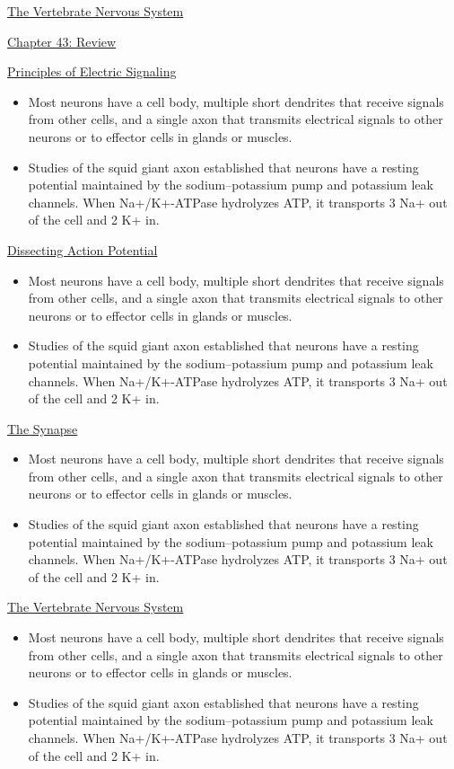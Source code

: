 \documentclass[12pt,letterpaper]{article}
\begin{document}
\begin{secbox}{\hyperlink{43}{The Vertebrate Nervous System}}
{\hypertarget{43.r}{}
\begin{probbox}{\hyperlink{43}{Chapter 43: Review}}\end{probbox}
    \hyperlink{43.1}{Principles of Electric Signaling}
    \begin{itemize} 
        \item Most neurons have a cell body, multiple short dendrites that receive signals from other cells, and a single axon that transmits electrical signals to other neurons or to effector cells in glands or muscles. 
        \item Studies of the squid giant axon established that neurons have a resting potential maintained by the sodium–potassium pump and potassium leak channels. When Na+/K+-ATPase hydrolyzes ATP, it transports 3 Na+ out of the cell and 2 K+ in.
    \end{itemize}
    \hyperlink{43.2}{Dissecting Action Potential}
    \begin{itemize}
        \item Most neurons have a cell body, multiple short dendrites that receive signals from other cells, and a single axon that transmits electrical signals to other neurons or to effector cells in glands or muscles. 
        \item Studies of the squid giant axon established that neurons have a resting potential maintained by the sodium–potassium pump and potassium leak channels. When Na+/K+-ATPase hydrolyzes ATP, it transports 3 Na+ out of the cell and 2 K+ in.     
    \end{itemize}
    \hyperlink{43.3}{The Synapse}
    \begin{itemize}
        \item Most neurons have a cell body, multiple short dendrites that receive signals from other cells, and a single axon that transmits electrical signals to other neurons or to effector cells in glands or muscles. 
        \item Studies of the squid giant axon established that neurons have a resting potential maintained by the sodium–potassium pump and potassium leak channels. When Na+/K+-ATPase hydrolyzes ATP, it transports 3 Na+ out of the cell and 2 K+ in.
    \end{itemize}
    \hyperlink{43.4}{The Vertebrate Nervous System}
    \begin{itemize}
        \item Most neurons have a cell body, multiple short dendrites that receive signals from other cells, and a single axon that transmits electrical signals to other neurons or to effector cells in glands or muscles. 
        \item Studies of the squid giant axon established that neurons have a resting potential maintained by the sodium–potassium pump and potassium leak channels. When Na+/K+-ATPase hydrolyzes ATP, it transports 3 Na+ out of the cell and 2 K+ in.
    \end{itemize}
 }\end{secbox}
\end{document}

